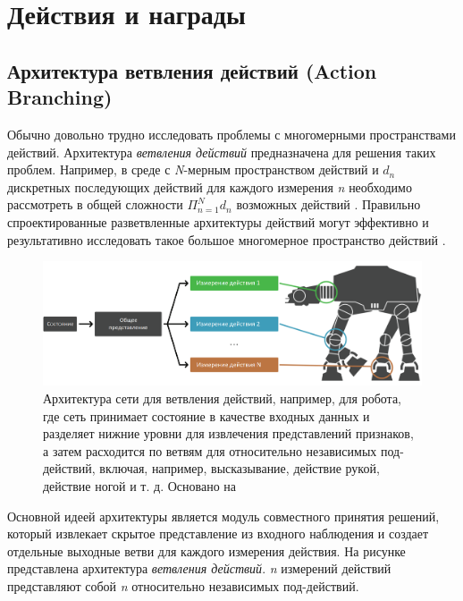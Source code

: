 \section{Действия и награды} \label{ch2:act-rew} %

\subsection{Архитектура ветвления действий (Action Branching)}

Обычно довольно трудно исследовать проблемы с многомерными пространствами действий. Архитектура \textit{ветвления действий} предназначена для решения таких проблем. Например, в среде с \textit{N}-мерным пространством действий и $d_n$ дискретных последующих действий для каждого измерения \textit{n} необходимо рассмотреть в общей сложности $\Pi^N_{n=1} d_n$ возможных действий \cite{tavakoli2017action}. Правильно спроектированные разветвленные архитектуры действий могут эффективно и результативно исследовать такое большое многомерное пространство действий \cite{tavakoli2017action}.

\begin{figure}[ht!]
    \center
    \includegraphics [scale=0.4] {my_folder/images/ch2/action-branching.png}
    \caption{Архитектура сети для ветвления действий, например, для робота, где сеть принимает состояние в качестве входных данных и разделяет нижние уровни для извлечения представлений признаков, а затем расходится по ветвям для относительно независимых под-действий, включая, например, высказывание, действие рукой, действие ногой и т. д. Основано на \cite{tavakoli2017action}}
    \label{fig:ch2-action-branching}
\end{figure}

Основной идеей архитектуры является модуль совместного принятия решений, который извлекает скрытое представление из входного наблюдения и создает отдельные выходные ветви для каждого измерения действия. На рисунке  представлена архитектура \textit{ветвления действий}. \textit{n} измерений действий представляют собой \textit{n} относительно независимых под-действий.

